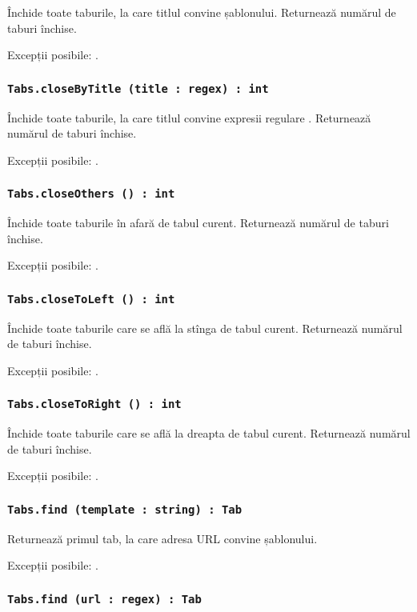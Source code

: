 Închide toate taburile, la care titlul convine șablonului. Returnează numărul de taburi închise.

Excepții posibile: .

\subsubsection{\lstinline|Tabs.closeByTitle (title : regex) : int|}

Închide toate taburile, la care titlul convine expresii regulare . Returnează numărul de taburi închise.

Excepții posibile: .

\subsubsection{\lstinline|Tabs.closeOthers () : int|}

Închide toate taburile în afară de tabul curent. Returnează numărul de taburi închise.

Excepții posibile: .

\subsubsection{\lstinline|Tabs.closeToLeft () : int|}

Închide toate taburile care se află la stînga de tabul curent. Returnează numărul de taburi închise.

Excepții posibile: .

\subsubsection{\lstinline|Tabs.closeToRight () : int|}

Închide toate taburile care se află la dreapta de tabul curent. Returnează numărul de taburi închise.

Excepții posibile: .

\subsubsection{\lstinline|Tabs.find (template : string) : Tab|}

Returnează primul tab, la care adresa URL convine șablonului.

Excepții posibile: .

\subsubsection{\lstinline|Tabs.find (url : regex) : Tab|}

